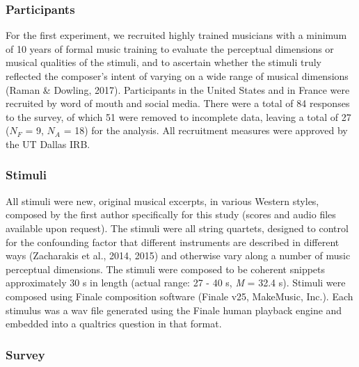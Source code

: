 \documentclass[
  english,
  man,floatsintext]{apa6}
\begin{document}
\hypertarget{participants}{%
\subsubsection{Participants}\label{participants}}

For the first experiment, we recruited highly trained musicians with a minimum of 10 years of formal music training to evaluate the perceptual dimensions or musical qualities of the stimuli, and to ascertain whether the stimuli truly reflected the composer's intent of varying on a wide range of musical dimensions (Raman \& Dowling, 2017). Participants in the United States and in France were recruited by word of mouth and social media. There were a total of 84 responses to the survey, of which 51 were removed to incomplete data, leaving a total of 27 (\(\textit{N}_F\) = 9, \(\textit{N}_A\) = 18) for the analysis. All recruitment measures were approved by the UT Dallas IRB.

\hypertarget{stimuli}{%
\subsubsection{Stimuli}\label{stimuli}}

All stimuli were new, original musical excerpts, in various Western styles, composed by the first author specifically for this study (scores and audio files available upon request). The stimuli were all string quartets, designed to control for the confounding factor that different instruments are described in different ways (Zacharakis et al., 2014, 2015) and otherwise vary along a number of music perceptual dimensions. The stimuli were composed to be coherent snippets approximately 30 s in length (actual range: 27 - 40 s, \emph{M} = 32.4 s). Stimuli were composed using Finale composition software (Finale v25, MakeMusic, Inc.). Each stimulus was a wav file generated using the Finale human playback engine and embedded into a qualtrics question in that format.

\hypertarget{survey}{%
\subsubsection{Survey}\label{survey}}
\end{document}
